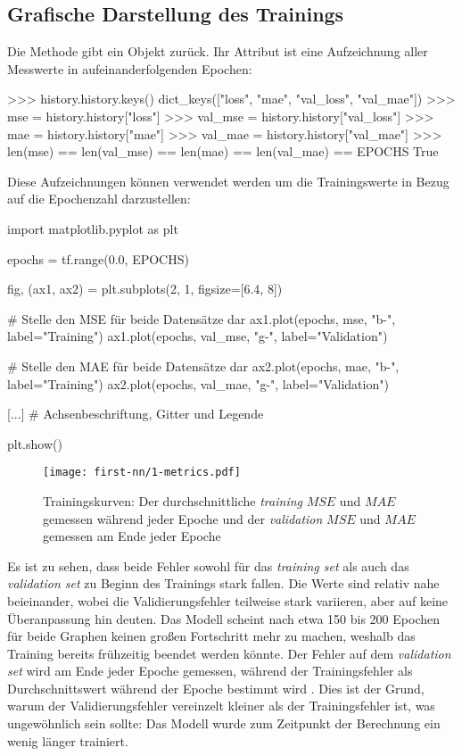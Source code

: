 \subsection{Grafische Darstellung des Trainings}
Die  Methode gibt ein  Objekt zurück.
Ihr  Attribut
ist eine Aufzeichnung aller Messwerte in aufeinanderfolgenden Epochen:
\begin{pyconcode}
>>> history.history.keys()
dict_keys(["loss", "mae", "val_loss", "val_mae"])
>>> mse = history.history["loss"]
>>> val_mse = history.history["val_loss"]
>>> mae = history.history["mae"]
>>> val_mae = history.history["val_mae"]
>>> len(mse) == len(val_mse) == len(mae) == len(val_mae) == EPOCHS
True
\end{pyconcode}
Diese Aufzeichnungen können verwendet werden um die Trainingswerte
in Bezug auf die Epochenzahl darzustellen:
\begin{pythoncode}
import matplotlib.pyplot as plt

epochs = tf.range(0.0, EPOCHS)

fig, (ax1, ax2) = plt.subplots(2, 1, figsize=[6.4, 8])

# Stelle den MSE für beide Datensätze dar
ax1.plot(epochs, mse, "b-", label="Training")
ax1.plot(epochs, val_mse, "g-", label="Validation")

# Stelle den MAE für beide Datensätze dar
ax2.plot(epochs, mae, "b-", label="Training")
ax2.plot(epochs, val_mae, "g-", label="Validation")

[...] # Achsenbeschriftung, Gitter und Legende

plt.show()
\end{pythoncode}
\begin{figure}[h!]
  \centering
  \texttt{[image: first-nn/1-metrics.pdf]}
  \caption{Trainingskurven: Der durchschnittliche \textit{training}
  $MSE$ und $MAE$ gemessen während jeder Epoche
  und der \textit{validation} $MSE$ und $MAE$
  gemessen am Ende jeder Epoche}
\end{figure}
\noindent
Es ist zu sehen, dass beide Fehler sowohl für das
\textit{training set} als auch das \textit{validation set}
zu Beginn des Trainings stark fallen.
Die Werte sind relativ nahe beieinander, wobei die Validierungsfehler
teilweise stark variieren, aber auf keine Überanpassung hin deuten.
Das Modell scheint nach etwa 150 bis 200 Epochen für beide Graphen
keinen großen Fortschritt mehr zu machen, weshalb
das Training bereits frühzeitig beendet werden könnte.
Der Fehler auf dem \textit{validation set} wird
am Ende jeder Epoche gemessen, während der Trainingsfehler als Durchschnittswert
während der Epoche bestimmt wird \parencite[305]{book:hands-on-ml}.
Dies ist der Grund, warum der Validierungsfehler
vereinzelt kleiner als der Trainingsfehler ist, was ungewöhnlich sein sollte:
Das Modell wurde zum Zeitpunkt der Berechnung ein wenig länger trainiert.

